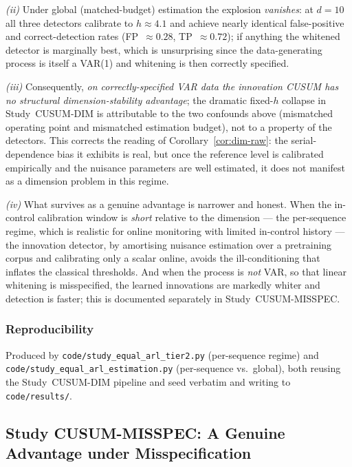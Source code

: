 \documentclass[bj,authoryear]{imsart}
\theoremstyle{plain}
\theoremstyle{definition}
\begin{document}
\emph{(ii)} Under global (matched-budget) estimation the explosion
\emph{vanishes}: at $d=10$ all three detectors calibrate to $h\approx4.1$ and
achieve nearly identical false-positive and correct-detection rates
(FP~$\approx0.28$, TP~$\approx0.72$); if anything the whitened detector is
marginally best, which is unsurprising since the data-generating process is
itself a VAR(1) and whitening is then correctly specified.

\emph{(iii)} Consequently, \emph{on correctly-specified VAR data the
innovation CUSUM has no structural dimension-stability advantage}; the
dramatic fixed-$h$ collapse in Study~CUSUM-DIM is attributable to the two
confounds above (mismatched operating point and mismatched estimation
budget), not to a property of the detectors.  This corrects the reading of
Corollary~\ref{cor:dim-raw}: the serial-dependence bias it exhibits is real, but
once the reference level is calibrated empirically and the nuisance
parameters are well estimated, it does not manifest as a dimension problem in
this regime.

\emph{(iv)} What survives as a genuine advantage is narrower and honest.
When the in-control calibration window is \emph{short} relative to the
dimension --- the per-sequence regime, which is realistic for online
monitoring with limited in-control history --- the innovation detector, by
amortising nuisance estimation over a pretraining corpus and calibrating only
a scalar online, avoids the ill-conditioning that inflates the classical
thresholds.  And when the process is \emph{not} VAR, so that linear whitening
is misspecified, the learned innovations are markedly whiter and detection is
faster; this is documented separately in Study~CUSUM-MISSPEC.

\subsubsection*{Reproducibility}
Produced by \texttt{code/study\_\allowbreak equal\_\allowbreak arl\_\allowbreak tier2.py} (per-sequence regime)
and \texttt{code/study\_\allowbreak equal\_\allowbreak arl\_\allowbreak estimation.py} (per-sequence vs.\ global),
both reusing the Study~CUSUM-DIM pipeline and seed verbatim and writing to
\texttt{code/results/}.

\subsection{Study CUSUM-MISSPEC: A Genuine Advantage under Misspecification}
\label{app:supp-misspec}
\end{document}
